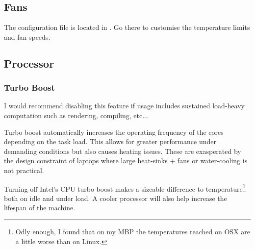 
\subsection{Fans}


The configuration file is located in . Go there to customise the temperature limits and fan speeds.

\subsection{Processor}


\subsubsection{Turbo Boost}

I would recommend disabling this feature if usage includes sustained load-heavy computation such as rendering, compiling, etc...

Turbo boost automatically increases the operating frequency of the cores depending on the task load. This allows for greater performance under demanding conditions but also causes heating issues. These are exasperated by the design constraint of laptops where large heat-sinks + fans or water-cooling is not practical.

Turning off Intel's CPU turbo boost makes a sizeable difference to temperature\footnote{Odly enough, I found that on my MBP the temperatures reached on OSX are a little worse than on Linux.} both on idle and under load. A cooler processor will also help increase the lifespan of the machine.

